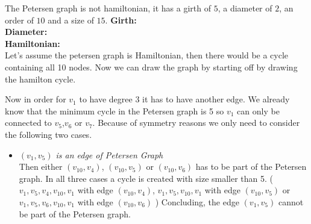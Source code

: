 \documentclass[a4paper]{article}
\begin{document}
\begin{solution}{9}
\begin{theorem}{The Petersen graph is not hamiltonian, it has a girth of $5$, a diameter of $2$, an order of $10$ and a size of $15$.}
			\textbf{Girth:} \\

			\textbf{Diameter:} \\

			\textbf{Hamiltonian:} \\
			Let's assume the petersen graph is Hamiltonian, then there would be a cycle containing all 10 nodes. 
			Now we can draw the graph by starting off by drawing the hamilton cycle. 
			\begin{center}
			\end{center}
			Now in order for $v_1$ to have degree 3 it has to have another edge. 
			We already know that the minimum cycle in the Petersen graph is 5 so $v_1$ can only be connected to $v_5$,$v_6$ or $v_7$. 
			Because of symmetry reasons we only need to consider the following two cases. 
			\begin{itemize}
				\item \emph{$(v_1,v_5)$ is an edge of Petersen Graph}\\
					Then either $(v_{10},v_4)$, $(v_{10},v_5)$ or $(v_{10},v_6)$ has to be part of the Petersen graph. 
					In all three cases a cycle is created with size smaller than 5. 
					($v_1,v_5,v_4,v_{10},v_1$ with edge $(v_{10},v_4)$,  $v_1,v_5,v_{10},v_1$ with edge $(v_{10},v_5)$ or $v_1,v_5,v_6,v_{10},v_1$ with edge $(v_{10},v_6)$ )
					Concluding, the edge $(v_1,v_5)$ cannot be part of the Petersen graph. 
					\begin{center}
\end{center}
\end{itemize}
\end{theorem}
\end{solution}
\end{document}

